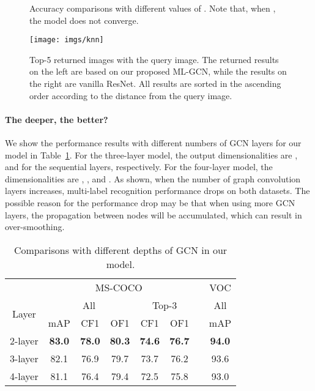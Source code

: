 \documentclass[10pt,twocolumn,letterpaper]{article}
\begin{document}
\begin{figure}
	\centering
	\caption{Accuracy comparisons with different values of . Note that, when , the model does not converge.}
	\label{fig:proportion}
\end{figure}

\begin{figure*}[t!]
	\centering
	\texttt{[image: imgs/knn]}
	\vspace{-0.5em}
	\caption{Top-5 returned images with the query image. The returned results on the left are based on our proposed ML-GCN, while the results on the right are vanilla ResNet. All results are sorted in the ascending order according to the distance from the query image.}
	\label{fig:knn}
\end{figure*}


\paragraph{The deeper, the better?}

We show the performance results with different numbers of GCN layers for our model in Table~\ref{table:depth}. For the three-layer model, the output dimensionalities are ,  and  for the sequential layers, respectively. For the four-layer model, the dimensionalities are , ,  and . As shown, when the number of graph convolution layers increases, multi-label recognition performance drops on both datasets. The possible reason for the performance drop may be that when using more GCN layers, the propagation between nodes will be accumulated, which can result in over-smoothing.



\begin{table}[t]
\footnotesize
\centering
\caption{Comparisons with different depths of GCN in our model.}
\vspace{0.1cm}
\begin{tabular}{|c||c|c|c||c|c|c|c|}
\cline{1-6} \cline{8-8} 
        & \multicolumn{5}{c|}{MS-COCO} && VOC \\
\cline{1-6} \cline{8-8}
\multirow{2}{*}{ Layer} & \multicolumn{3}{c||}{{All}} & \multicolumn{2}{c|}{{Top-3}} && All \\
\cline{2-6} \cline{8-8} & mAP & CF1 & OF1 & CF1 & OF1 && mAP \\
\cline{1-6} \cline{8-8}
2-layer & \textbf{83.0} & \textbf{78.0} & \textbf{80.3} & \textbf{74.6} & \textbf{76.7} && \textbf{94.0}\\
3-layer & 82.1 & 76.9 & 79.7 & 73.7 & 76.2 && 93.6\\
4-layer & 81.1 & 76.4 & 79.4 & 72.5 & 75.8 && 93.0\\
\cline{1-6} \cline{8-8}
\end{tabular}
\label{table:depth}
\end{table}
\end{document}
